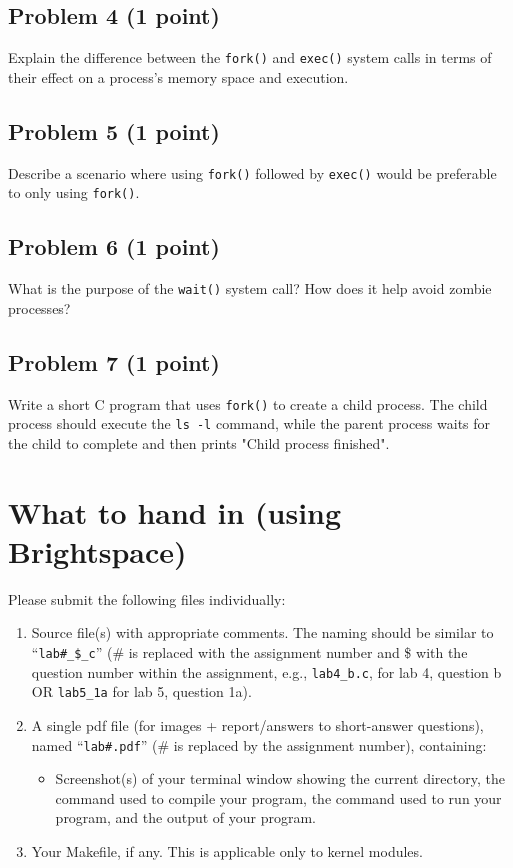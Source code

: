\documentclass{article}
\begin{document}
\subsection*{Problem 4 (1 point)}

Explain the difference between the \texttt{fork()} and \texttt{exec()} system calls in terms of their effect on a process's memory space and execution.


\subsection*{Problem 5 (1 point)}

Describe a scenario where using \texttt{fork()} followed by \texttt{exec()} would be preferable to only using \texttt{fork()}.


\subsection*{Problem 6 (1 point)}

What is the purpose of the \texttt{wait()} system call?  How does it help avoid zombie processes?


\subsection*{Problem 7 (1 point)}

Write a short C program that uses \texttt{fork()} to create a child process. The child process should execute the \texttt{ls -l} command, while the parent process waits for the child to complete and then prints "Child process finished".


\section*{What to hand in (using Brightspace)}

Please submit the following files individually:

\begin{enumerate}
    \item Source file(s) with appropriate comments. The naming should be similar to “\texttt{lab\#\_\$\_c}” (\# is replaced with the assignment number and \$ with the question number within the assignment, e.g., \texttt{lab4\_b.c}, for lab 4, question b OR \texttt{lab5\_1a} for lab 5, question 1a).
    \item A single pdf file (for images + report/answers to short-answer questions), named “\texttt{lab\#.pdf}” (\# is replaced by the assignment number), containing:
    \begin{itemize}
        \item Screenshot(s) of your terminal window showing the current directory, the command used to compile your program, the command used to run your program, and the output of your program.
    \end{itemize}
    \item Your Makefile, if any. This is applicable only to kernel modules.
\end{enumerate}
\end{document}
